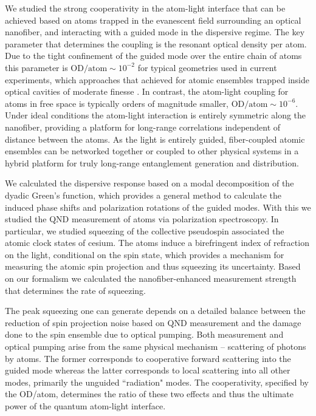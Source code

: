 \documentclass[preprint, aps,pra,onecolumn]{revtex4-1} %
\begin{document}
We studied the strong cooperativity in the atom-light interface that can be achieved based on atoms trapped in the evanescent field surrounding an optical nanofiber, and interacting with a guided mode in the dispersive regime. 
The key parameter that determines the coupling is the resonant optical density per atom. 
Due to the tight confinement of the guided mode over the entire chain of atoms this parameter is $ \mathrm{OD}/\mathrm{atom}\sim 10^{-2} $ for typical geometries used in current experiments, which approaches that achieved for atomic ensembles trapped inside optical cavities of moderate finesse \cite{chen_conditional_2011, zhang_collective_2012}.  
In contrast, the atom-light coupling for atoms in free space is typically orders of magnitude smaller, $ \mathrm{OD}/\mathrm{atom} \sim 10^{-6}$.  
Under ideal conditions the atom-light interaction is entirely symmetric along the nanofiber, providing a platform for long-range correlations independent of distance between the atoms. 
As the light is entirely guided, fiber-coupled atomic ensembles can be networked together or coupled to other physical systems in a hybrid platform \cite{hafezi_atomic_2012, liebermeister_tapered_2014} for truly long-range entanglement generation and distribution. 

We calculated the dispersive response based on a modal decomposition of the dyadic Green's function, which provides a general method to calculate the induced phase shifts and polarization rotations of the guided modes. 
With this we studied the QND measurement of atoms via polarization spectroscopy. 
In particular, we studied squeezing of the collective pseudospin associated the atomic clock states of cesium. 
The atoms induce a birefringent index of refraction on the light, conditional on the spin state, which provides a mechanism for measuring the atomic spin projection and thus squeezing its uncertainty.  
Based on our formalism we calculated the nanofiber-enhanced measurement strength that determines the rate of squeezing.  

The peak squeezing one can generate depends on a detailed balance between the reduction of spin projection noise based on QND measurement and the damage done to the spin ensemble due to optical pumping.  
Both measurement and optical pumping arise from the same physical mechanism -- scattering of photons by atoms.  
The former corresponds to cooperative forward scattering into the guided mode whereas the latter corresponds to local scattering into all other modes, primarily the unguided ``radiation" modes.   
The cooperativity, specified by the OD/atom, determines the ratio of these two effects and thus the ultimate power of the quantum atom-light interface. 
\end{document}
